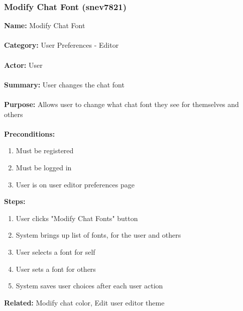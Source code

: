 \documentclass[11pt]{report}
\begin{document}
\subsubsection{Modify Chat Font (snev7821)}
\begin{framed}
	\noindent\textbf{Name:} Modify Chat Font \\ \\
	\textbf{Category:} User Preferences - Editor  \\ \\
	\textbf{Actor:} User \\ \\
	\textbf{Summary:} User changes the chat font \\ \\
	\textbf{Purpose:} Allows user to change what chat font they see for themselves and others \\ \\
	\textbf{Preconditions:} 
	\begin{enumerate}
		\item Must be registered
		\item Must be logged in
		\item User is on user editor preferences page
	\end{enumerate}
	\textbf{Steps:}
	\begin{enumerate}
		\item User clicks "Modify Chat Fonts" button
		\item System brings up list of fonts, for the user and others
		\item User selects a font for self
		\item User sets a font for others
		\item System saves user choices after each user action
	\end{enumerate}
	\textbf{Related:} Modify chat color, Edit user editor theme
\end{framed}

\newpage
\end{document}
